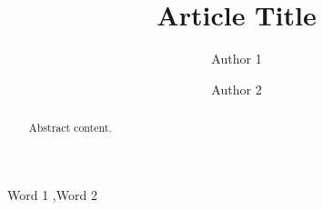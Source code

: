 \documentclass[preprint,3p]{elsarticle}
\begin{document}
\begin{frontmatter}  %
\title{Article Title }

\author[school1]{Author 1}
\author[school1]{Author 2}

\address[school1]{Address of school 1.}


\begin{abstract}
Abstract content.
\end{abstract}
\begin{keyword}
Word 1 \sep Word 2
\end{keyword}
\end{frontmatter}




\newpage
\appendix
\end{document}
